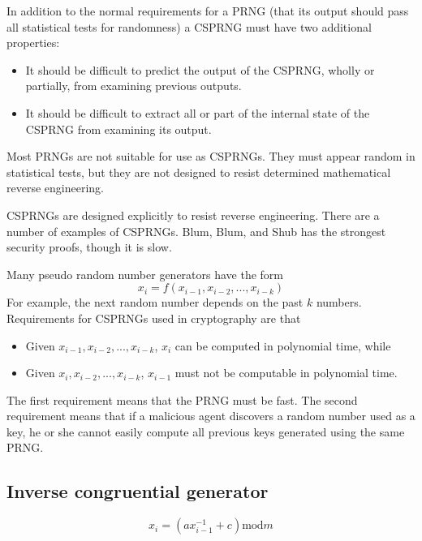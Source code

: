 \documentclass[justified, sixbynine]{tufte-book}
\theoremstyle{plain}%
\newtheorem * {corollary}{Corollary}
\theoremstyle{definition}
\theoremstyle{remark}
\newtheorem * {remark}{Remark}
\newtheorem * {note}{Note}
\begin{document}
\begin{fullwidth}
In addition to the normal requirements for a PRNG (that its output
should pass all statistical tests for randomness) a CSPRNG must have two
additional properties:

\begin{itemize}
\item  It should be difficult to predict the output of the CSPRNG, wholly or
partially, from examining previous outputs.

\item  It should be difficult to extract all or part of the internal state
of the CSPRNG from examining its output.
\end{itemize}

Most PRNGs are not suitable for use as CSPRNGs. They must appear random
in statistical tests, but they are not designed to resist determined
mathematical reverse engineering.

CSPRNGs are designed explicitly to resist reverse engineering. There are a
number of examples of CSPRNGs. Blum, Blum, and Shub has the strongest security
proofs, though it is slow.

Many pseudo random number generators have the form
\begin{equation}
x_i=f(x_{i-1}, x_{i-2}, ..., x_{i-k})
\end{equation}
For example, the next random number depends on the past $k$ numbers. Requirements for CSPRNGs used in cryptography are that

\begin{itemize}
\item  Given $x_{i-1}, x_{i-2}, ..., x_{i-k}$, $x_i$ can be computed in
polynomial time, while

\item  Given $x_i, x_{i-2}, ..., x_{i-k}$, $x_{i-1}$ must not be computable in
polynomial time.
\end{itemize}

The first requirement means that the PRNG must be fast. The second
requirement means that if a malicious agent discovers a random number used
as a key, he or she cannot easily compute all previous keys generated using the
same PRNG.

\goodbreak\subsection{Inverse congruential generator}

\begin{equation}
x_i=(ax_{i-1}^{-1}+c)\textrm{mod}m
\end{equation}


\end{fullwidth}
\end{document}
